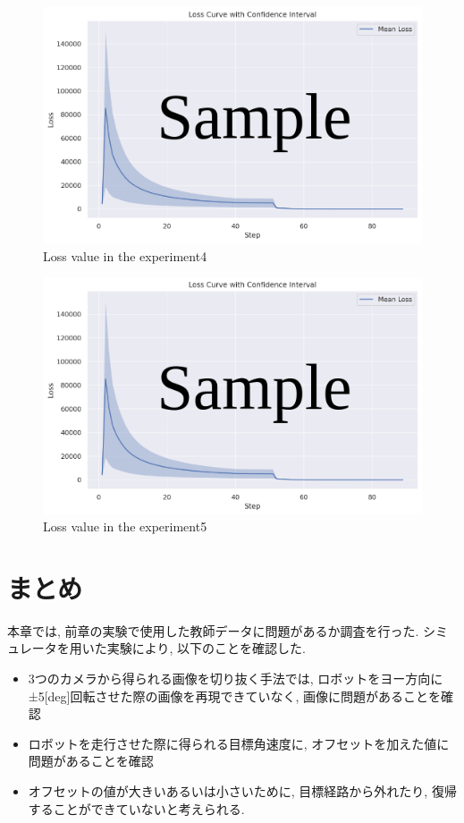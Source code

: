 \begin{figure}[h]
  \centering
  \includegraphics[keepaspectratio, scale=0.6]{images/sample.png}
  \caption{Loss value in the experiment4}
  \label{Fig:sample4}
\end{figure}

\begin{figure}[h]
  \centering
  \includegraphics[keepaspectratio, scale=0.6]{images/sample.png}
  \caption{Loss value in the experiment5}
  \label{Fig:sample5}
\end{figure}

\section{まとめ}
本章では, 前章の実験で使用した教師データに問題があるか調査を行った. シミュレータを用いた実験により, 以下のことを確認した.

\begin{itemize}
  \item 3つのカメラから得られる画像を切り抜く手法では, ロボットをヨー方向に±5[deg]回転させた際の画像を再現できていなく, 画像に問題があることを確認
  \item ロボットを走行させた際に得られる目標角速度に, オフセットを加えた値に問題があることを確認
  \item オフセットの値が大きいあるいは小さいために, 目標経路から外れたり, 復帰することができていないと考えられる.
\end{itemize}

